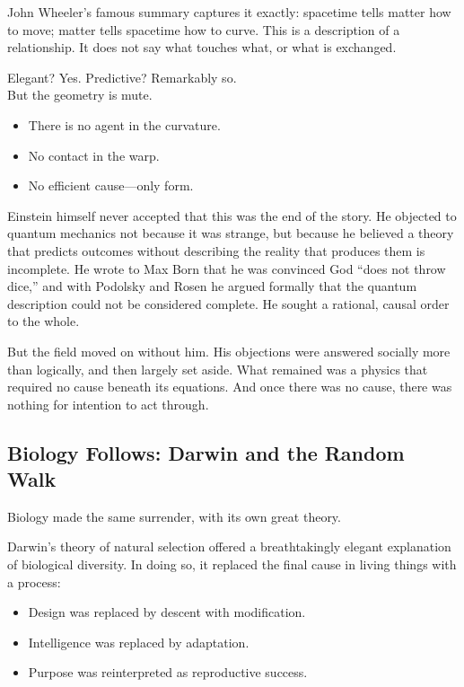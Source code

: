 \documentclass[11pt,a4paper]{article}
\begin{document}
John Wheeler's famous summary captures it exactly: spacetime tells matter how to move; matter tells spacetime how to curve. This is a description of a relationship. It does not say what touches what, or what is exchanged.

Elegant? Yes. Predictive? Remarkably so.\\
But the geometry is mute.

\begin{itemize}
  \item There is no agent in the curvature.
  \item No contact in the warp.
  \item No efficient cause---only form.
\end{itemize}

Einstein himself never accepted that this was the end of the story. He objected to quantum mechanics not because it was strange, but because he believed a theory that predicts outcomes without describing the reality that produces them is incomplete. He wrote to Max Born that he was convinced God ``does not throw dice,'' and with Podolsky and Rosen he argued formally that the quantum description could not be considered complete. He sought a rational, causal order to the whole.

But the field moved on without him. His objections were answered socially more than logically, and then largely set aside. What remained was a physics that required no cause beneath its equations. And once there was no cause, there was nothing for intention to act through.

\subsection{Biology Follows: Darwin and the Random Walk}

Biology made the same surrender, with its own great theory.

Darwin's theory of natural selection offered a breathtakingly elegant explanation of biological diversity. In doing so, it replaced the final cause in living things with a process:

\begin{itemize}
  \item Design was replaced by descent with modification.
  \item Intelligence was replaced by adaptation.
  \item Purpose was reinterpreted as reproductive success.
\end{itemize}
\end{document}
